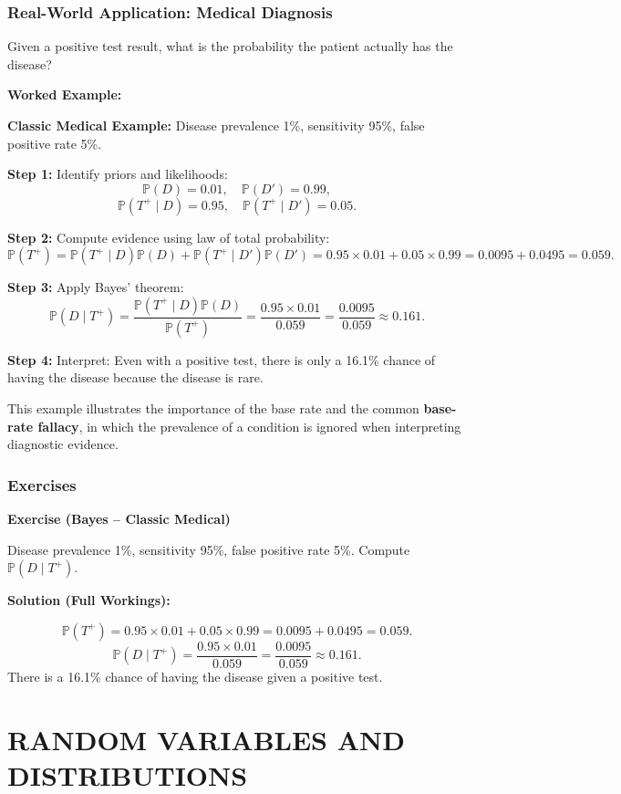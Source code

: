 \documentclass[12pt,a4paper,oneside]{report}
\theoremstyle{mytheorem}
\theoremstyle{mydefinition}
\theoremstyle{myremark}
\newenvironment{exercise}[1]{%
  \par\medskip\noindent\textbf{\color{myblue}Exercise (#1)}\par\smallskip
}{%
  \par\smallskip
}
\newenvironment{solution}{%
  \par\noindent\textbf{\color{mygreen}Solution (Full Workings):}\par\smallskip
}{%
  \par\bigskip
}
\newenvironment{worked}{%
  \par\medskip\noindent\textbf{\color{myorange}Worked Example:}\par\smallskip
}{%
  \par\medskip
}
\newcommand{\Prob}{\mathbb{P}}
\begin{document}
\section{Real-World Application: Medical Diagnosis}
Given a positive test result, what is the probability the patient actually has the disease?

\begin{worked}
\textbf{Classic Medical Example:}
Disease prevalence 1\%, sensitivity 95\%, false positive rate 5\%.

\textbf{Step 1:} Identify priors and likelihoods:
\[
\Prob(D) = 0.01,\quad \Prob(D') = 0.99,
\]
\[
\Prob(T^+ \mid D) = 0.95,\quad \Prob(T^+ \mid D') = 0.05.
\]

\textbf{Step 2:} Compute evidence using law of total probability:
\[
\Prob(T^+) = \Prob(T^+ \mid D)\Prob(D) + \Prob(T^+ \mid D')\Prob(D')
= 0.95 \times 0.01 + 0.05 \times 0.99 = 0.0095 + 0.0495 = 0.059.
\]

\textbf{Step 3:} Apply Bayes' theorem:
\[
\Prob(D \mid T^+) = \frac{\Prob(T^+ \mid D) \Prob(D)}{\Prob(T^+)}
= \frac{0.95 \times 0.01}{0.059} = \frac{0.0095}{0.059} \approx 0.161.
\]

\textbf{Step 4:} Interpret: Even with a positive test, there is only a 16.1\% chance of having the disease because the disease is rare.

This example illustrates the importance of the base rate and the common \textbf{base-rate fallacy}, in which the prevalence of a condition is ignored when interpreting diagnostic evidence.
\end{worked}

\section{Exercises}
\begin{exercise}{Bayes – Classic Medical}
Disease prevalence 1\%, sensitivity 95\%, false positive rate 5\%. Compute $\Prob(D \mid T^+)$.
\end{exercise}
\begin{solution}
\[
\Prob(T^+) = 0.95 \times 0.01 + 0.05 \times 0.99 = 0.0095 + 0.0495 = 0.059.
\]
\[
\Prob(D \mid T^+) = \frac{0.95 \times 0.01}{0.059} = \frac{0.0095}{0.059} \approx 0.161.
\]
There is a 16.1\% chance of having the disease given a positive test.
\end{solution}

\part{RANDOM VARIABLES AND DISTRIBUTIONS}
\end{document}
